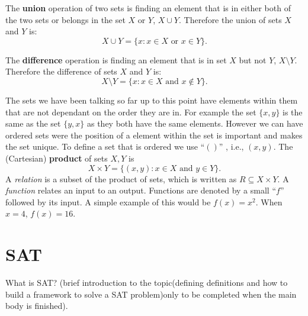 \documentclass[11pt,a4paper]{report}
\begin{document}
The \textbf{union} operation of two sets is finding an element that is in either both of the two sets or belongs in the set $X$ or $Y$, $X \cup Y$. Therefore the union of sets $X$ and $Y$ is:
\begin{displaymath}
  X \cup Y = \{x : x \in X  \text{ or } x \in Y\}.
\end{displaymath}

The \textbf{difference} operation is finding an element that is in set $X$ but not $Y$, $X \setminus Y$. Therefore the difference of sets $X$ and $Y$ is:
\begin{displaymath}
  X \setminus Y = \{x : x \in X  \text{ and } x \notin Y\}.
\end{displaymath}

The sets we have been talking so far up to this point have elements within them that are not dependant on the order they are in. For example the set $\{x,y\}$ is the same as the set $\{y, x\}$ as they both have the same elements. However we can have ordered sets were the position of a element within the set is important and makes the set unique. To define a set that is ordered we use ``$()$'' , i.e., $(x,y)$. 
The (Cartesian) \textbf{product} of sets $X, Y$ is
\begin{displaymath}
  X \times Y = \{(x,y) : x \in X \text{ and } y \in Y\}.
\end{displaymath}
A \emph{relation} is a subset of the product of sets, which is written as $R \subseteq X \times Y$. A \emph{function} relates an input to an output. Functions are denoted by a small ``$f$'' followed by its input. A simple example of this would be $f(x) = x^2$. When $x=4$, $f(x) = 16$.



\section{SAT}
\label{sec:SAT}

What is SAT? (brief introduction to the topic(defining definitions and how to build a framework to solve a SAT problem)only to be completed when the main body is finished).
\end{document}
